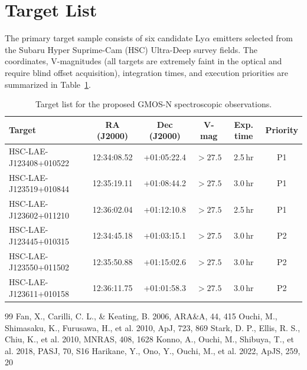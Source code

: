 \section{Target List}
The primary target sample consists of six candidate Ly$\alpha$ emitters selected from the Subaru Hyper Suprime-Cam (HSC) Ultra-Deep survey fields. The coordinates, V-magnitudes (all targets are extremely faint in the optical and require blind offset acquisition), integration times, and execution priorities are summarized in Table~\ref{tab:targets}.

\begin{table}[htbp]
\centering
\caption{Target list for the proposed GMOS-N spectroscopic observations.}
\label{tab:targets}
\vspace{0.2cm}
\small
\begin{tabular}{lccccc}
\toprule
\textbf{Target} & \textbf{RA (J2000)} & \textbf{Dec (J2000)} & \textbf{V-mag} & \textbf{Exp. time} & \textbf{Priority} \\
\midrule
HSC-LAE-J123408+010522 & 12:34:08.52 & +01:05:22.4 & $>27.5$ & 2.5\,hr & P1 \\
HSC-LAE-J123519+010844 & 12:35:19.11 & +01:08:44.2 & $>27.5$ & 3.0\,hr & P1 \\
HSC-LAE-J123602+011210 & 12:36:02.04 & +01:12:10.8 & $>27.5$ & 2.5\,hr & P1 \\
HSC-LAE-J123445+010315 & 12:34:45.18 & +01:03:15.1 & $>27.5$ & 3.0\,hr & P2 \\
HSC-LAE-J123550+011502 & 12:35:50.88 & +01:15:02.6 & $>27.5$ & 3.0\,hr & P2 \\
HSC-LAE-J123611+010158 & 12:36:11.75 & +01:01:58.3 & $>27.5$ & 3.0\,hr & P2 \\
\bottomrule
\end{tabular}
\end{table}

\begin{thebibliography}{99}
 Fan, X., Carilli, C. L., \& Keating, B. 2006, ARA\&A, 44, 415
 Ouchi, M., Shimasaku, K., Furusawa, H., et al. 2010, ApJ, 723, 869
 Stark, D. P., Ellis, R. S., Chiu, K., et al. 2010, MNRAS, 408, 1628
 Konno, A., Ouchi, M., Shibuya, T., et al. 2018, PASJ, 70, S16
 Harikane, Y., Ono, Y., Ouchi, M., et al. 2022, ApJS, 259, 20
\end{thebibliography}
